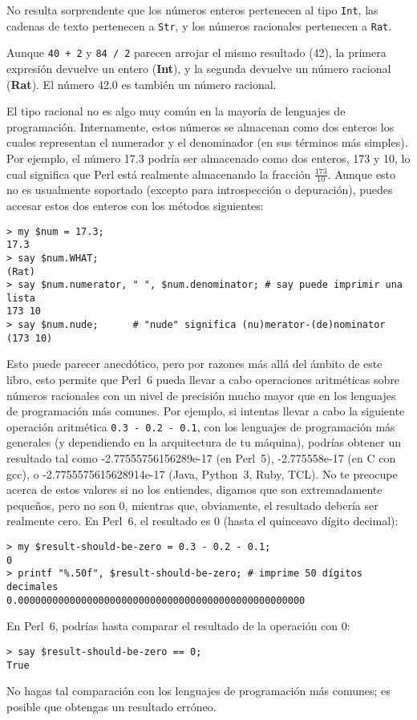 No resulta sorprendente que los números enteros pertenecen al tipo
{\tt Int}, las cadenas de texto pertenecen a {\tt Str}, y los números racionales
pertenecen a {\tt Rat}. 

Aunque {\tt 40 + 2} y {\tt 84 / 2} parecen arrojar el mismo resultado (42),
la primera expresión devuelve un entero ({\bf Int}), y la segunda devuelve
un número racional ({\bf Rat}). El número 42.0 es también un número racional.

El tipo racional no es algo muy común en la mayoría de lenguajes de programación.
Internamente, estos números se almacenan como dos enteros los cuales representan
el numerador y el denominador (en sus términos más simples). Por ejemplo, el número
17.3 podría ser almacenado como dos enteros, 173 y 10, lo cual significa que
Perl está realmente almacenando la fracción $\frac{173}{10}$. Aunque esto no es 
usualmente soportado (excepto para introspección o depuración), puedes accesar estos
dos enteros con los métodos siguientes:

\begin{lstlisting}
> my $num = 17.3;
17.3
> say $num.WHAT;
(Rat)
> say $num.numerator, " ", $num.denominator; # say puede imprimir una lista
173 10
> say $num.nude;      # "nude" significa (nu)merator-(de)nominator
(173 10) 
\end{lstlisting}
%
Esto puede parecer anecdótico, pero por razones más allá del
ámbito de este libro, esto permite que Perl~6 pueda llevar a cabo 
operaciones aritméticas sobre números racionales con un nivel 
de precisión mucho mayor que en los lenguajes de programación más comunes.
Por ejemplo, si intentas llevar a cabo la siguiente operación aritmética 
\verb'0.3 - 0.2 - 0.1', con los lenguajes de programación más generales 
(y dependiendo en la arquitectura de tu máquina), podrías obtener un resultado
tal como -2.77555756156289e-17 (en Perl~5), 
-2.775558e-17 (en C con gcc), o -2.7755575615628914e-17 
(Java, Python~3, Ruby, TCL). No te preocupe acerca de estos valores si no
los entiendes, digamos que son extremadamente pequeños, pero no son 0,
mientras que, obviamente, el resultado debería ser realmente cero. En 
Perl~6, el resultado es 0 (hasta el quinceavo dígito decimal):
\begin{lstlisting}
> my $result-should-be-zero = 0.3 - 0.2 - 0.1;
0
> printf "%.50f", $result-should-be-zero; # imprime 50 dígitos decimales
0.00000000000000000000000000000000000000000000000000
\end{lstlisting}
%
En Perl~6, podrías hasta comparar el resultado de la operación con 0:
\begin{lstlisting}
> say $result-should-be-zero == 0;
True
\end{lstlisting}
%
No hagas tal comparación con los lenguajes de programación más comunes;
es posible que obtengas un resultado erróneo.

